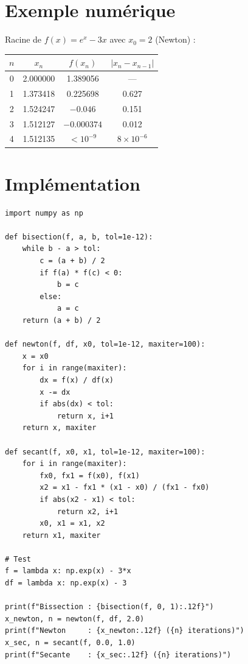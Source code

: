 \section{Exemple num\'erique}

Racine de $f(x)=e^x-3x$ avec $x_0=2$ (Newton) :
\begin{center}
\begin{tabular}{cccc}
\toprule
$n$ & $x_n$ & $f(x_n)$ & $|x_n-x_{n-1}|$ \\
\midrule
0 & 2.000000 & 1.389056 & --- \\
1 & 1.373418 & 0.225698 & 0.627 \\
2 & 1.524247 & $-0.046$ & 0.151 \\
3 & 1.512127 & $-0.000374$ & 0.012 \\
4 & 1.512135 & $<10^{-9}$ & $8\times10^{-6}$ \\
\bottomrule
\end{tabular}
\end{center}

\section{Impl\'ementation}

\begin{codeblock}[title=\textbf{Python}]
\begin{verbatim}
import numpy as np

def bisection(f, a, b, tol=1e-12):
    while b - a > tol:
        c = (a + b) / 2
        if f(a) * f(c) < 0:
            b = c
        else:
            a = c
    return (a + b) / 2

def newton(f, df, x0, tol=1e-12, maxiter=100):
    x = x0
    for i in range(maxiter):
        dx = f(x) / df(x)
        x -= dx
        if abs(dx) < tol:
            return x, i+1
    return x, maxiter

def secant(f, x0, x1, tol=1e-12, maxiter=100):
    for i in range(maxiter):
        fx0, fx1 = f(x0), f(x1)
        x2 = x1 - fx1 * (x1 - x0) / (fx1 - fx0)
        if abs(x2 - x1) < tol:
            return x2, i+1
        x0, x1 = x1, x2
    return x1, maxiter

# Test
f = lambda x: np.exp(x) - 3*x
df = lambda x: np.exp(x) - 3

print(f"Bissection : {bisection(f, 0, 1):.12f}")
x_newton, n = newton(f, df, 2.0)
print(f"Newton     : {x_newton:.12f} ({n} iterations)")
x_sec, n = secant(f, 0.0, 1.0)
print(f"Secante    : {x_sec:.12f} ({n} iterations)")
\end{verbatim}
\end{codeblock}

